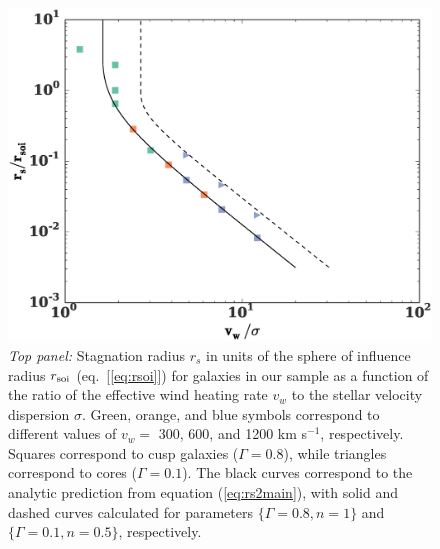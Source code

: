 \documentclass[usenatbib,fleqn]{mn2e}
\begin{document}
\begin{figure}
  \includegraphics[width=\columnwidth]{rs.eps}
  \caption{\label{fig:stag} \emph{Top panel:} Stagnation radius
    $r_{s}$ in units of the sphere of influence radius $r_{\rm
      soi}$ (eq.~[\ref{eq:rsoi}]) for galaxies in our sample as a
    function of the ratio of the effective wind heating rate $v_{w}$
    to the stellar velocity dispersion $\sigma$.  Green, orange, and
    blue symbols correspond to different values of $v_{w} =$ 300, 600, and 1200 km s$^{-1}$,
    respectively.  Squares correspond to cusp galaxies ($\Gamma = 0.8$), while
    triangles correspond to cores ($\Gamma = 0.1$). The black curves correspond to the
    analytic prediction from equation (\ref{eq:rs2main}), with solid and dashed curves calculated for parameters $\{\Gamma=0.8, n=1\}$ and $\{\Gamma=0.1,n=0.5\}$, respectively. }
\end{figure}
\end{document}
